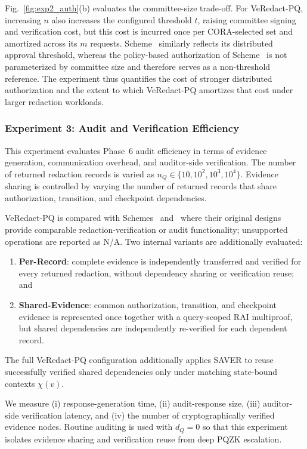 \documentclass[lettersize,journal]{IEEEtran}
\begin{document}
Fig.~\ref{fig:exp2_auth}(b) evaluates the committee-size trade-off.
For VeRedact-PQ, increasing $n$ also increases the configured threshold
$t$, raising committee signing and verification cost, but this cost is
incurred once per CORA-selected set and amortized across its $m$
requests. Scheme~\cite{ref1} similarly reflects its distributed
approval threshold, whereas the policy-based authorization of
Scheme~\cite{ref34} is not parameterized by committee size and therefore
serves as a non-threshold reference. The experiment thus quantifies
the cost of stronger distributed authorization and the extent to which
VeRedact-PQ amortizes that cost under larger redaction workloads.

\subsubsection*{\textbf{Experiment 3: Audit and Verification Efficiency}}

This experiment evaluates Phase~6 audit efficiency in terms of evidence
generation, communication overhead, and auditor-side verification. The
number of returned redaction records is varied as
$n_Q\in\{10,10^2,10^3,10^4\}$. Evidence sharing is controlled by
varying the number of returned records that share authorization,
transition, and checkpoint dependencies.

VeRedact-PQ is compared with Schemes~\cite{ref1} and~\cite{ref13}
where their original designs provide comparable redaction-verification
or audit functionality; unsupported operations are reported as N/A.
Two internal variants are additionally evaluated:
\begin{enumerate}
\item \textbf{Per-Record}: complete evidence is independently
transferred and verified for every returned redaction, without
dependency sharing or verification reuse; and
\item \textbf{Shared-Evidence}: common authorization, transition, and
checkpoint evidence is represented once together with a query-scoped
RAI multiproof, but shared dependencies are independently re-verified
for each dependent record.
\end{enumerate}
The full VeRedact-PQ configuration additionally applies SAVER to reuse
successfully verified shared dependencies only under matching
state-bound contexts $\chi(v)$.

We measure (i) response-generation time, (ii) audit-response size,
(iii) auditor-side verification latency, and (iv) the number of
cryptographically verified evidence nodes. Routine auditing is used
with $d_Q=0$ so that this experiment isolates evidence sharing and
verification reuse from deep PQZK escalation.
\end{document}
